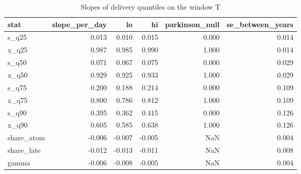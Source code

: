\begin{table}
\caption{Slopes of delivery quantiles on the window T}
\label{tab:parkinson_slopes}
\begin{tabular}{lrrrrr}
\toprule
stat & slope\_per\_day & lo & hi & parkinson\_null & se\_between\_years \\
\midrule
s\_q25 & 0.013 & 0.010 & 0.015 & 0.000 & 0.014 \\
x\_q25 & 0.987 & 0.985 & 0.990 & 1.000 & 0.014 \\
s\_q50 & 0.071 & 0.067 & 0.075 & 0.000 & 0.029 \\
x\_q50 & 0.929 & 0.925 & 0.933 & 1.000 & 0.029 \\
s\_q75 & 0.200 & 0.188 & 0.214 & 0.000 & 0.109 \\
x\_q75 & 0.800 & 0.786 & 0.812 & 1.000 & 0.109 \\
s\_q90 & 0.395 & 0.362 & 0.415 & 0.000 & 0.126 \\
x\_q90 & 0.605 & 0.585 & 0.638 & 1.000 & 0.126 \\
share\_atom & -0.006 & -0.007 & -0.005 & NaN & 0.004 \\
share\_late & -0.012 & -0.013 & -0.011 & NaN & 0.008 \\
gamma & -0.006 & -0.008 & -0.005 & NaN & 0.004 \\
\bottomrule
\end{tabular}
\end{table}
